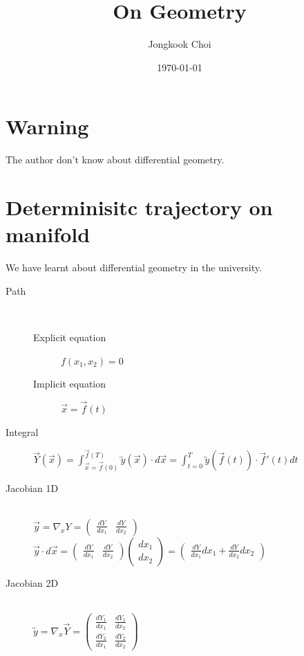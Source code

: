 \documentclass{article}
\title{On Geometry}
\author{Jongkook Choi}
\date{\today}
\begin{document}
\maketitle

\section{Warning}
The author don't know about differential geometry.

\section{Determinisitc trajectory on manifold}
We have learnt about differential geometry in the university.

\begin{description}
    \item[Path] ~
          \begin{description}
              \item[Explicit equation] $f(x_1,x_2) = 0$
              \item[Implicit equation] $\vec{x} = \vec{f}(t)$
          \end{description}
    \item[Integral]
          $\vec{Y}(\vec{x}) = \int_{\vec{x}=\vec{f}(0)}^{\vec{f}(T)} \overleftrightarrow{y}(\vec{x}) \cdot d \vec{x}
              = \int_{t=0}^{T} \overleftrightarrow{y}(\vec{f}(t)) \cdot \vec{f}'(t) dt$
    \item[Jacobian 1D] ~\\
          $\vec{y} = \nabla_x Y = \begin{pmatrix} \frac{dY}{dx_1}  & \frac{dY}{dx_2} \end{pmatrix}$\\
          $\vec{y}\cdot d\vec{x} = \begin{pmatrix} \frac{dY}{dx_1} & \frac{dY}{dx_2} \end{pmatrix} \begin{pmatrix} dx_1 \\ dx_2 \end{pmatrix} = \begin{pmatrix} \frac{dY}{dx_1}dx_1 + \frac{dY}{dx_2}dx_2 \end{pmatrix}$\\
    \item[Jacobian 2D] ~\\
          $\overleftrightarrow{y} = \nabla_x \vec{Y} = \begin{pmatrix} \frac{dY_1}{dx_1} & \frac{dY_1}{dx_2} \\ \frac{dY_2}{dx_1} & \frac{dY_2}{dx_2} \end{pmatrix}$\\

\end{description}
\end{document}
